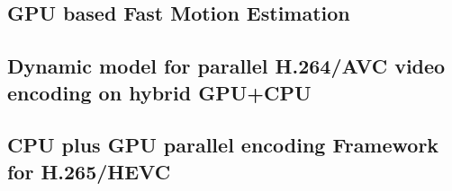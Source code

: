 \subsection*{GPU based Fast Motion Estimation}
\label{sec:paper1}


\subsection*{Dynamic model for parallel H.264/AVC video encoding
on hybrid GPU+CPU}
\label{sec:paper2}


\subsection*{CPU plus GPU parallel encoding
Framework for H.265/HEVC}
\label{sec:paper3}
